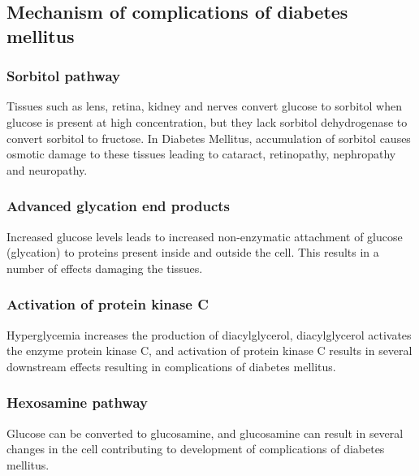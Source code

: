 \documentclass[
]{book}
\begin{document}
\subsection{Mechanism of complications of diabetes mellitus}\label{mechanism-of-complications-of-diabetes-mellitus}

\subsubsection*{Sorbitol pathway}\label{sorbitol-pathway}

Tissues such as lens, retina, kidney and nerves convert glucose to sorbitol when glucose is present at high concentration, but they lack sorbitol dehydrogenase to convert sorbitol to fructose. In Diabetes Mellitus, accumulation of sorbitol causes osmotic damage to these tissues leading to cataract, retinopathy, nephropathy and neuropathy.

\subsubsection*{Advanced glycation end products}\label{advanced-glycation-end-products}

Increased glucose levels leads to increased non-enzymatic attachment of glucose (glycation) to proteins present inside and outside the cell. This results in a number of effects damaging the tissues.

\subsubsection*{Activation of protein kinase C}\label{activation-of-protein-kinase-c}

Hyperglycemia increases the production of diacylglycerol, diacylglycerol activates the enzyme protein kinase C, and activation of protein kinase C results in several downstream effects resulting in complications of diabetes mellitus.

\subsubsection*{Hexosamine pathway}\label{hexosamine-pathway}

Glucose can be converted to glucosamine, and glucosamine can result in several changes in the cell contributing to development of complications of diabetes mellitus.
\end{document}
